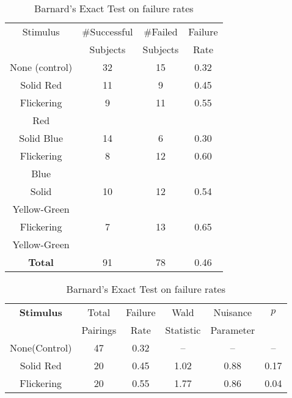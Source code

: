 \documentclass{llncs}
\begin{document}
\begin{table}[!htb]
\parbox{.45\textwidth}{
\vspace*{-0.3cm}
\smaller
\centering 
\caption{\scriptsize Subject Failure Statistics}
\label{tab:FR}
{\setlength{\extrarowheight}{10pt}
\begin{tabular}{||c|c|c|c||}
\hline \cline{1-4}
Stimulus & \#Successful &\#Failed  & Failure \vspace*{-0.3cm} \\
				&  Subjects & Subjects & Rate
\\ \hline \cline{1-4}
None (control)	& 32 	& 15 	& 0.32  
\\  \hline
Solid Red &	         11 &	9	& 0.45
\\ \hline
Flickering &	9 &	11	& 0.55
\vspace*{-0.3cm}\\
Red & & &
\\ \hline
Solid Blue &	14 &	6	& 0.30
\\ \hline
Flickering &           	8 & 12	 & 0.60
\vspace*{-0.3cm}\\
Blue  & & & 
\\ \hline
Solid &           	10 & 12	 & 0.54
\vspace*{-0.3cm}\\
Yellow-Green & & &
\\ \hline
Flickering &           	7 & 13 & 0.65
\vspace*{-0.3cm}\\
Yellow-Green & & &
\\ \hline
{\bf Total} &           	91 & 78	& 0.46
\\ \hline \cline{1-4}
\end{tabular}}
}
\hfill
\parbox{.45\textwidth}{
\scriptsize
\centering 
\caption{\scriptsize Barnard's Exact Test on failure rates}
\label{tab:BT}
{\setlength{\extrarowheight}{10pt}
\begin{tabular}{||c|c|c|c|c|c||}
\hline \cline{1-6} \bf
Stimulus & Total & Failure & Wald & Nuisance & {\it $p$} 
\vspace*{-0.3cm} \\
			  &  Pairings & Rate &  Statistic & Parameter &  \rm
\\ \hline
None(Control) & 47 & 0.32& --&--&--
\\  \hline
Solid Red &	        20 &	0.45	& 1.02 & 0.88 & 0.17
\\ \hline
Flickering &	20 &	0.55	& 1.77 & 0.86 & 0.04
\vspace*{-0.3cm}\\

\end{tabular}}}
\end{table}
\end{document}

